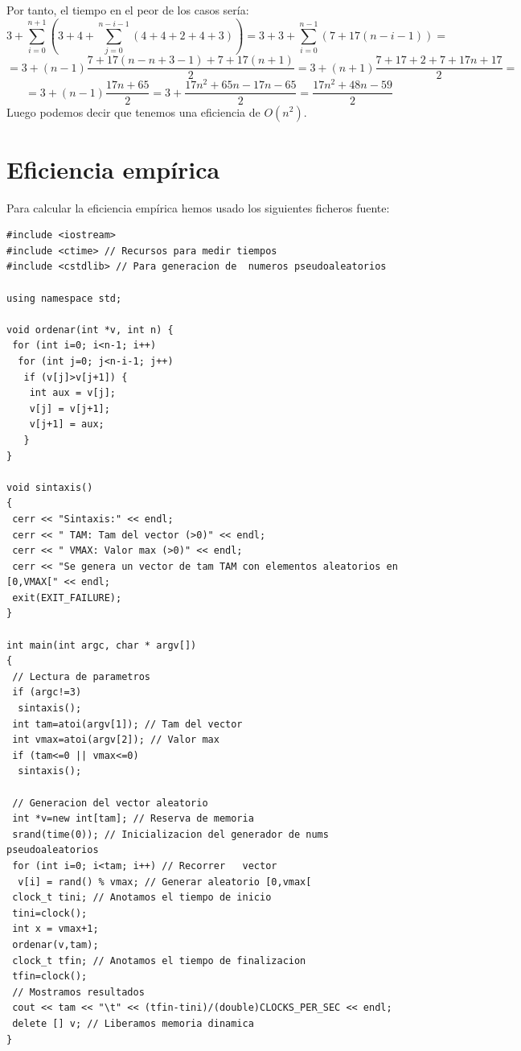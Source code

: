 \documentclass[a4paper,11pt]{article}
\begin{document}
Por tanto, el tiempo en el peor de los casos sería: 
\begin{displaymath}
3+\sum_{i=0}^{n+1}(3+4+\sum_{j=0}^{n-i-1}(4+4+2+4+3))=3+3+\sum_{i=0}^{n-1}(7+17(n-i-1))=
\end{displaymath}
\begin{displaymath}
=3+(n-1)\frac{7+17(n-n+3-1)+7+17(n+1)}{2}=3+(n+1)\frac{7+17+2+7+17n+17}{2}=
\end{displaymath}
\begin{displaymath}
=3+(n-1)\frac{17n+65}{2}=3+\frac{17n^2+65n-17n-65}{2}=\frac{17n^2+48n-59}{2}
\end{displaymath}
Luego podemos decir que tenemos una eficiencia de $O(n^2)$.
\section{Eficiencia empírica}
Para calcular la eficiencia empírica hemos usado los siguientes ficheros fuente:
\lstset{language=C, breaklines=true, basicstyle=\footnotesize}
\begin{lstlisting}[frame=single]
#include <iostream>
#include <ctime> // Recursos para medir tiempos
#include <cstdlib> // Para generacion de  numeros pseudoaleatorios

using namespace std;

void ordenar(int *v, int n) {
 for (int i=0; i<n-1; i++)
  for (int j=0; j<n-i-1; j++)
   if (v[j]>v[j+1]) {
    int aux = v[j];
    v[j] = v[j+1];
    v[j+1] = aux;
   }
}

void sintaxis()
{
 cerr << "Sintaxis:" << endl;
 cerr << " TAM: Tam del vector (>0)" << endl;
 cerr << " VMAX: Valor max (>0)" << endl;
 cerr << "Se genera un vector de tam TAM con elementos aleatorios en [0,VMAX[" << endl;
 exit(EXIT_FAILURE);
}

int main(int argc, char * argv[])
{
 // Lectura de parametros
 if (argc!=3)
  sintaxis();
 int tam=atoi(argv[1]); // Tam del vector
 int vmax=atoi(argv[2]); // Valor max
 if (tam<=0 || vmax<=0)
  sintaxis();
  
 // Generacion del vector aleatorio
 int *v=new int[tam]; // Reserva de memoria
 srand(time(0)); // Inicializacion del generador de nums pseudoaleatorios
 for (int i=0; i<tam; i++) // Recorrer   vector
  v[i] = rand() % vmax; // Generar aleatorio [0,vmax[
 clock_t tini; // Anotamos el tiempo de inicio
 tini=clock();
 int x = vmax+1;
 ordenar(v,tam);
 clock_t tfin; // Anotamos el tiempo de finalizacion
 tfin=clock();
 // Mostramos resultados
 cout << tam << "\t" << (tfin-tini)/(double)CLOCKS_PER_SEC << endl;
 delete [] v; // Liberamos memoria dinamica
}
\end{lstlisting}
\end{document}
